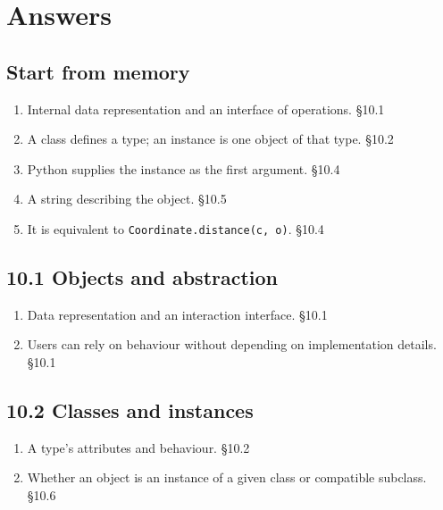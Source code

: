 \documentclass[11pt]{article}
\begin{document}
\clearpage
\section{Answers}
\begin{keepsection}\subsection{Start from memory}

\begin{enumerate}
\item Internal data representation and an interface of operations. \hfill{\small\color{FAUblue}§10.1}
\item A class defines a type; an instance is one object of that type. \hfill{\small\color{FAUblue}§10.2}
\item Python supplies the instance as the first argument. \hfill{\small\color{FAUblue}§10.4}
\item A string describing the object. \hfill{\small\color{FAUblue}§10.5}
\item It is equivalent to \texttt{Coordinate.distance(c, o)}. \hfill{\small\color{FAUblue}§10.4}
\end{enumerate}

\end{keepsection}
\begin{keepsection}\subsection{10.1 Objects and abstraction}

\begin{enumerate}
\item Data representation and an interaction interface. \hfill{\small\color{FAUblue}§10.1}
\item Users can rely on behaviour without depending on implementation details. \hfill{\small\color{FAUblue}§10.1}
\end{enumerate}

\end{keepsection}
\begin{keepsection}\subsection{10.2 Classes and instances}

\begin{enumerate}
\item A type’s attributes and behaviour. \hfill{\small\color{FAUblue}§10.2}
\item Whether an object is an instance of a given class or compatible subclass. \hfill{\small\color{FAUblue}§10.6}
\end{enumerate}

\end{keepsection}
\end{document}
